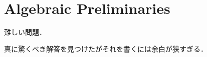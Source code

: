 \section{Algebraic Preliminaries}
\begin{prob}
  難しい問題．
\end{prob}
\begin{ans}
  真に驚くべき解答を見つけたがそれを書くには余白が狭すぎる．
\end{ans}



